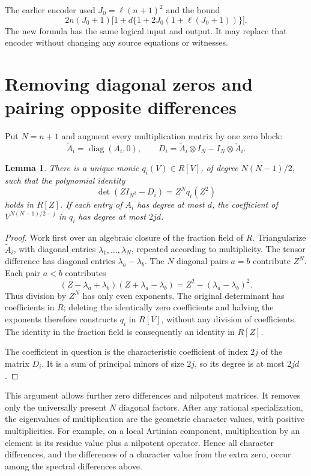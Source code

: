 \documentclass[11pt]{article}
\newtheorem{lemma}[theorem]{Lemma}
\begin{document}
The earlier encoder \cite{old} used \(J_0=\ell(n+1)^2\) and the bound
\[
 2n(J_0+1)\bigl[1+d\{1+2J_0(1+\ell(J_0+1))\}\bigr].
\]
The new formula has the same logical input and output. It may replace
that encoder without changing any source equations or witnesses.

\section{Removing diagonal zeros and pairing opposite differences}

Put \(N=n+1\) and augment every multiplication matrix by one zero block:
\[
 \widetilde A_i=\operatorname{diag}(A_i,0),\qquad
 D_i=\widetilde A_i\otimes I_N-I_N\otimes\widetilde A_i.
\]

\begin{lemma}\label{paired}
There is a unique monic \(q_i(V)\in R[V]\), of degree
\(N(N-1)/2\), such that the polynomial identity
\[
                 \det(ZI_{N^2}-D_i)=Z^Nq_i(Z^2)
\]
holds in \(R[Z]\). If each entry of \(A_i\) has degree at most \(d\),
the coefficient of \(V^{N(N-1)/2-j}\) in \(q_i\) has degree at
most \(2jd\).
\end{lemma}
\begin{proof}
Work first over an algebraic closure of the fraction field of \(R\).
Triangularize \(\widetilde A_i\), with diagonal entries
\(\lambda_1,\ldots,\lambda_N\), repeated according to multiplicity.
The tensor difference has diagonal entries
\(\lambda_a-\lambda_b\). The \(N\) diagonal pairs \(a=b\) contribute
\(Z^N\). Each pair \(a<b\) contributes
\[
 (Z-\lambda_a+\lambda_b)(Z+\lambda_a-\lambda_b)
       =Z^2-(\lambda_a-\lambda_b)^2.
\]
Thus division by \(Z^N\) has only even exponents. The original
determinant has coefficients in \(R\); deleting the identically zero
coefficients and halving the exponents therefore constructs \(q_i\)
in \(R[V]\), without any division of coefficients. The identity in
the fraction field is consequently an identity in \(R[Z]\).

The coefficient in question is the characteristic coefficient of
index \(2j\) of the matrix \(D_i\). It is a sum of principal minors
of size \(2j\), so its degree is at most \(2jd\).
\end{proof}

This argument allows further zero differences and nilpotent matrices.
It removes only the universally present \(N\) diagonal factors.
After any rational specialization, the eigenvalues of multiplication
are the geometric character values, with positive multiplicities.
For example, on a local Artinian component, multiplication by an
element is its residue value plus a nilpotent operator. Hence all
character differences, and the differences of a character value from
the extra zero, occur among the spectral differences above.
\end{document}
